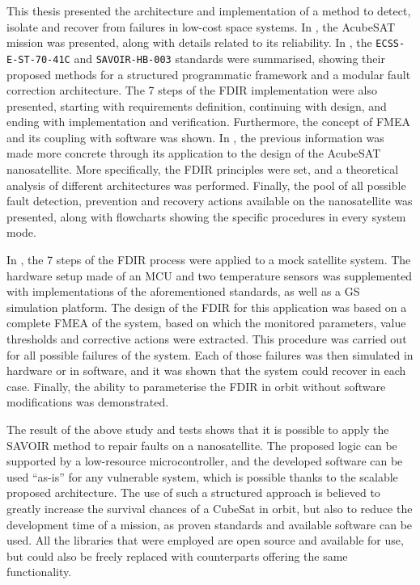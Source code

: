 \documentclass[a4paper,nobib]{tufte-book}
\begin{document}
\begin{fullwidth}
This thesis presented the architecture and implementation of a method to detect, isolate and recover from failures in low-cost space systems. In , the AcubeSAT mission was presented, along with details related to its reliability. In , the \texttt{ECSS-E-ST-70-41C} and \texttt{SAVOIR-HB-003} standards were summarised, showing their proposed methods for a structured programmatic framework and a modular fault correction architecture. The 7 steps of the \acs{FDIR} implementation were also presented, starting with requirements definition, continuing with design, and ending with implementation and verification. Furthermore, the concept of \acf{FMEA} and its coupling with software was shown. In , the previous information was made more concrete through its application to the design of the AcubeSAT nanosatellite. More specifically, the \acs{FDIR} principles were set, and a theoretical analysis of different architectures was performed. Finally, the pool of all possible fault detection, prevention and recovery actions available on the nanosatellite was presented, along with flowcharts showing the specific procedures in every system mode.

In , the 7 steps of the \acs{FDIR} process were applied to a mock satellite system. The hardware setup made of an \acs{MCU} and two temperature sensors was supplemented with implementations of the aforementioned standards, as well as a \acl{GS} simulation platform. The design of the \acs{FDIR} for this application was based on a complete \acs{FMEA} of the system, based on which the monitored parameters, value thresholds and corrective actions were extracted. This procedure was carried out for all possible failures of the system. Each of those failures was then simulated in hardware or in software, and it was shown that the system could recover in each case. Finally, the ability to parameterise the \acs{FDIR} in orbit without software modifications was demonstrated.

The result of the above study and tests shows that it is possible to apply the \acs{SAVOIR} method to repair faults on a nanosatellite. The proposed logic can be supported by a low-resource microcontroller, and the developed software can be used ``as-is'' for any vulnerable system, which is possible thanks to the scalable proposed architecture. The use of such a structured approach is believed to greatly increase the survival chances of a CubeSat in orbit, but also to reduce the development time of a mission, as proven standards and available software can be used. All the libraries that were employed are open source and available for use, but could also be freely replaced with counterparts offering the same functionality.


\end{fullwidth}
\end{document}
